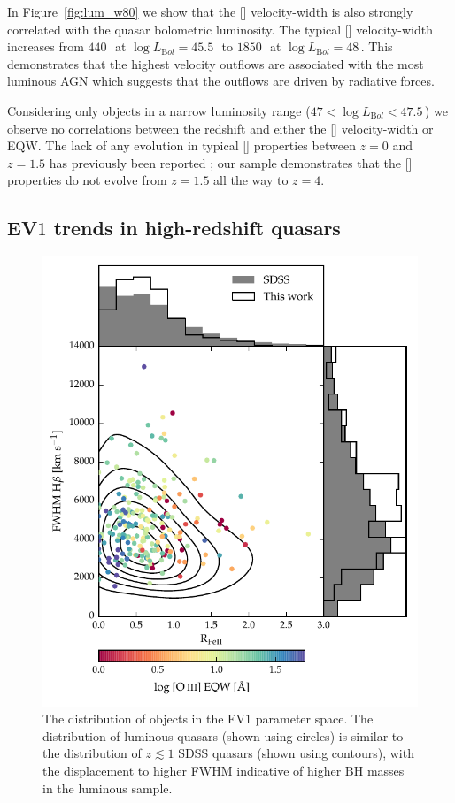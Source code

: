 In Figure~\ref{fig:lum_w80} we show that the [] velocity-width is also strongly correlated with the quasar bolometric luminosity.
The typical [] velocity-width increases from $440$\,\kms\, at $\log L_{\mathrm Bol}=45.5$\,\ergs\, to $1850$\,\kms\, at $\log L_{\mathrm Bol}=48$\,\ergs.  
This demonstrates that the highest velocity outflows are associated with the most luminous AGN which suggests that the outflows are driven by radiative forces. 

Considering only objects in a narrow luminosity range ($47 < \log L_{\mathrm Bol} < 47.5$\,\ergs) we observe no correlations between the redshift and either the [] velocity-width or EQW.   
The lack of any evolution in typical [] properties between $z=0$ and $z=1.5$ has previously been reported \citep[e.g.][]{harrison16}; our sample demonstrates that the [] properties do not evolve from $z=1.5$ all the way to $z=4$. 

\subsection{EV$1$ trends in high-redshift quasars}

\begin{figure}[t!]
\centering 
    \includegraphics[width=\columnwidth]{figures/chapter04/ev1_lowz.pdf} 
    \caption[{EV$1$ parameter space.}]{The distribution of objects in the EV$1$ parameter space. The distribution of luminous quasars (shown using circles) is similar to the distribution of $z \lesssim 1$ SDSS quasars (shown using contours), with the displacement to higher \hb FWHM indicative of higher BH masses in the luminous sample.}      
    \label{fig:ev1_lowz}
\end{figure}

